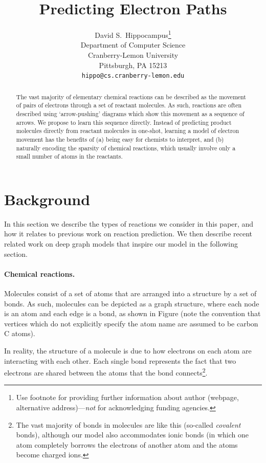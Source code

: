 \documentclass{article}
\title{Predicting Electron Paths}
\author{
  David S.~Hippocampus\thanks{Use footnote for providing further
    information about author (webpage, alternative
    address)---\emph{not} for acknowledging funding agencies.} \\
  Department of Computer Science\\
  Cranberry-Lemon University\\
  Pittsburgh, PA 15213 \\
  \texttt{hippo@cs.cranberry-lemon.edu} \\
}
\begin{document}

\maketitle

\begin{abstract}
The vast majority of elementary chemical reactions can be described as the movement of pairs of electrons through a set of reactant molecules. As such, reactions are often described using `arrow-pushing' diagrams which show this movement as a sequence of arrows. We propose to learn this sequence directly. Instead of predicting product molecules directly from reactant molecules in one-shot, learning a model of electron movement has the benefits of (a) being easy for chemists to interpret, and (b) naturally encoding the sparsity of chemical reactions, which usually involve only a small number of atoms in the reactants.
\end{abstract}

\section{Background}
In this section we describe the types of reactions we consider in this paper, and how it relates to previous work on reaction prediction. We then describe recent related work on deep graph models that inspire our model in the following section.

\paragraph{Chemical reactions.}
Molecules consist of a set of atoms that are arranged into a structure by a set of bonds. As such, molecules can be depicted as a graph structure, where each node is an atom and each edge is a bond, as shown in Figure (note the convention that vertices which do not explicitly specify the atom name are assumed to be carbon C atoms). 

In reality, the structure of a molecule is due to how electrons on each atom are interacting with each other. Each single bond represents the fact that two electrons are shared between the atoms that the bond connects\footnote{The vast majority of bonds in molecules are like this (so-called \emph{covalent} bonds), although our model also accommodates ionic bonds (in which one atom completely borrows the electrons of another atom and the atoms become charged ions.}.
\end{document}
